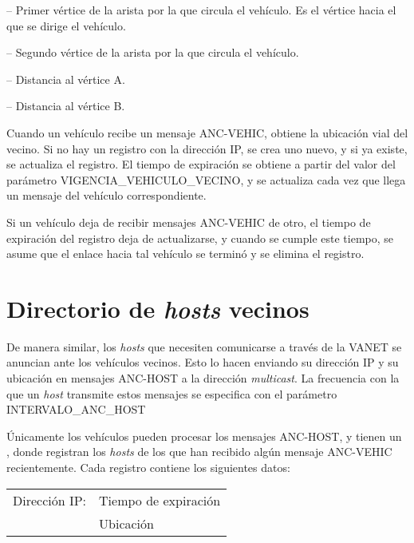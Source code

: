 -- Primer vértice de la arista por la que
circula el vehículo. Es el vértice hacia el que se dirige el vehículo.

 -- Segundo vértice de la arista por la que
circula el vehículo.

 -- Distancia al vértice A.

 -- Distancia al vértice B.

\begin{sloppypar}
Cuando un vehículo recibe un mensaje ANC-VEHIC, obtiene la ubicación vial del
vecino. Si no hay un registro con la dirección IP, se crea uno nuevo, y si ya
existe, se actualiza el registro. El tiempo de expiración se obtiene a partir
del valor del parámetro VIGENCIA\_VEHICULO\_VECINO, y se actualiza cada vez que
llega un mensaje del vehículo correspondiente.
\end{sloppypar}

Si un vehículo deja de recibir mensajes ANC-VEHIC de otro, el tiempo de
expiración del registro deja de actualizarse, y cuando se cumple este tiempo,
se asume que el enlace hacia tal vehículo se terminó y se elimina el registro.

\section{Directorio de \textit{hosts} vecinos}

\label{sec:directorio_hosts_vecinos}

De manera similar, los \textit{hosts} que necesiten comunicarse a través de
la VANET se anuncian ante los vehículos vecinos. Esto lo hacen enviando su
dirección IP y su ubicación en mensajes ANC-HOST a la dirección
\textit{multicast}. La frecuencia con la que un \textit{host} transmite estos
mensajes se especifica con el parámetro INTERVALO\_ANC\_HOST

Únicamente los vehículos pueden procesar los mensajes ANC-HOST, y tienen un
, donde registran los \textit{hosts} de
los que han recibido algún mensaje ANC-VEHIC recientemente. Cada registro
contiene los siguientes datos:

\begin{center}
\begin{tabular}{ r l }
Dirección IP: & Tiempo de expiración \\
& Ubicación \\
\end{tabular}
\end{center}

